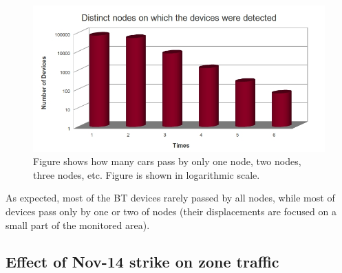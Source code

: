 \documentclass{llncs}
\begin{document}
 \begin{figure}[htb]
 \begin{center}
 \includegraphics[scale=0.4]{NodosPorDondePasan.jpg}
 \caption{Figure shows how many cars pass by only one node, two nodes, three nodes, etc. Figure is shown in logarithmic scale.
 \label{fNodosPorDondePasan}}
 \end{center}
 \end{figure}

As expected, most of the BT devices rarely passed by all nodes, while most of devices pass only by one or two of nodes (their displacements are focused on a small part of the monitored area).


\subsection{Effect of Nov-14 strike on zone traffic}


\end{document}
